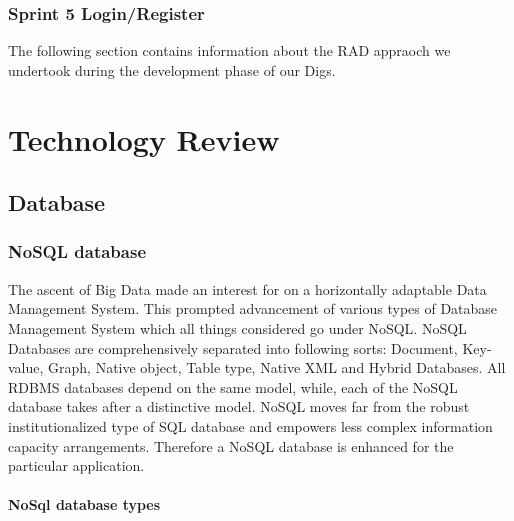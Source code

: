 \subsection{Sprint 5 Login/Register}

\noindent The following section contains information about the RAD appraoch we undertook during the development phase of our Digs.

\chapter{Technology Review}

\section{Database}

\subsection{NoSQL database}
The ascent of Big Data made an interest for on a horizontally adaptable Data Management System. This prompted advancement of various types of Database Management System which all things considered go under NoSQL. NoSQL Databases are comprehensively separated into following sorts: Document, Key-value, Graph, Native object, Table type, Native XML and Hybrid Databases. All RDBMS databases depend on the same model, while, each of the NoSQL database takes after a distinctive model. NoSQL moves far from the robust institutionalized type of SQL database and empowers less complex information capacity arrangements. Therefore a NoSQL database is enhanced for the particular application.\cite{noSql}

\subsubsection{NoSql database types}

